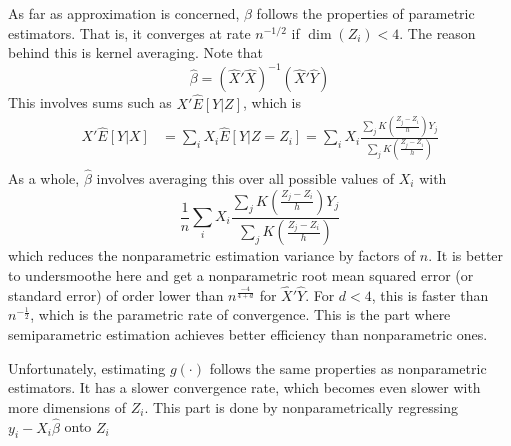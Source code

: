 \documentclass[12pt]{article}
\theoremstyle{definition}
\theoremstyle{property}
\theoremstyle{assumption}
\theoremstyle{example}
\theoremstyle{comment}
\begin{document}
\par
As far as approximation is concerned, $\beta$ follows the properties of parametric estimators. That is, it converges at rate $n^{-1/2}$ if $\dim(Z_i)<4$. The reason behind this is kernel averaging.  Note that 
\[
\hat{\beta} = (\widehat{X}'\widehat{X})^{-1} (\widehat{X}'\widehat{Y})
\]
This involves sums such as $X'\widehat{E}[Y|Z]$, which is
\[
\begin{aligned}
X'\widehat{E}[Y|X]&=\sum_{i}X_i\widehat{E}[Y|Z=Z_i]=\sum_{i}X_i\frac{\sum_jK\left(\frac{Z_j-Z_i}{h}\right)Y_j}{\sum_jK\left(\frac{Z_j-Z_i}{h}\right)}\\
\end{aligned}
\]
As a whole, $\hat{\beta}$ involves averaging this over all possible values of $X_i$ with
\[
\frac{1}{n}\sum_{i}X_i\frac{\sum_jK\left(\frac{Z_j-Z_i}{h}\right)Y_j}{\sum_jK\left(\frac{Z_j-Z_i}{h}\right)}
\]
which reduces the nonparametric estimation variance by factors of $n$. It is better to undersmoothe here and get a nonparametric root mean squared error (or standard error) of order lower than $n^{\frac{-4}{4+d}}$ for $\widehat{X}'\widehat{Y}$. For $d<4$, this is faster than $n^{-\frac{1}{2}}$, which is the parametric rate of convergence. This is the part where semiparametric estimation achieves better efficiency than nonparametric ones. 
\par
Unfortunately, estimating $g(\cdot)$ follows the same properties as nonparametric estimators. It has a slower convergence rate, which becomes even slower with more dimensions of $Z_i$. This part is done by nonparametrically regressing $y_i-X_i\hat{\beta}$ onto $Z_i$\par
\end{document}
